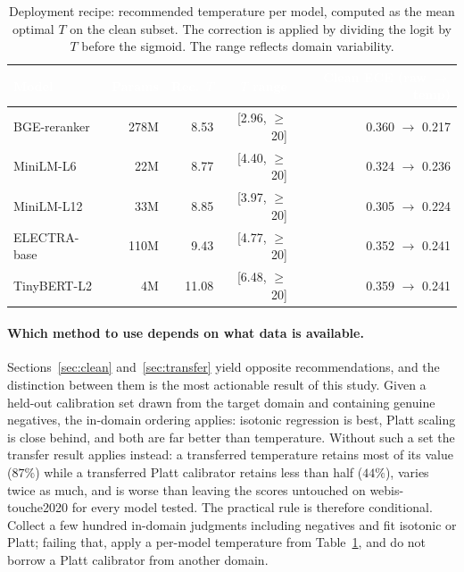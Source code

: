 \documentclass[sn-mathphys-num,pdflatex]{sn-jnl}
\newcommand{\thead}[1]{\textcolor{white}{\textbf{#1}}}
\begin{document}
\begin{table}[t]
\centering
\caption{Deployment recipe: recommended temperature per model, computed as the
mean optimal $T$ on the clean subset. The correction is applied by dividing the
logit by $T$ before the sigmoid. The range reflects domain
variability.}\label{tab:recipe}
\small
\begin{tabular}{lrrrr}
\toprule
\rowcolor{headblue}
\thead{Model} & \thead{Params} & \thead{Rec.\ $T$} & \thead{$T$ range} & \thead{Clean ECE (raw $\to$ temp)} \\
\midrule
\rowcolor{rowlight}
BGE-reranker & 278M & 8.53  & [2.96, $\geq$20] & 0.360 $\to$ 0.217 \\
\rowcolor{rowwhite}
MiniLM-L6    & 22M  & 8.77  & [4.40, $\geq$20] & 0.324 $\to$ 0.236 \\
\rowcolor{rowlight}
MiniLM-L12   & 33M  & 8.85  & [3.97, $\geq$20] & 0.305 $\to$ 0.224 \\
\rowcolor{rowwhite}
ELECTRA-base & 110M & 9.43  & [4.77, $\geq$20] & 0.352 $\to$ 0.241 \\
\rowcolor{rowlight}
TinyBERT-L2  & 4M   & 11.08 & [6.48, $\geq$20] & 0.359 $\to$ 0.241 \\
\bottomrule
\end{tabular}
\end{table}

\paragraph{Which method to use depends on what data is available.}
Sections~\ref{sec:clean} and~\ref{sec:transfer} yield opposite recommendations, and
the distinction between them is the most actionable result of this study. Given a
held-out calibration set drawn from the target domain and containing genuine
negatives, the in-domain ordering applies: isotonic regression is best, Platt
scaling is close behind, and both are far better than temperature. Without such a
set the transfer result applies instead: a transferred temperature retains most of
its value ($87\%$) while a transferred Platt calibrator retains less than half
($44\%$), varies twice as much, and is worse than leaving the scores untouched on
webis-touche2020 for every model tested. The practical rule is therefore conditional. Collect a few hundred
in-domain judgments including negatives and fit isotonic or Platt; failing that,
apply a per-model temperature from Table~\ref{tab:recipe}, and do not borrow a Platt
calibrator from another domain.
\end{document}
